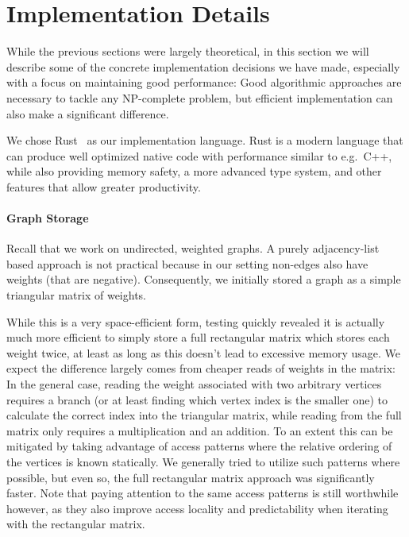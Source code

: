 \documentclass[12pt,oneside,english,parskip=full,headings=small]{scrbook}
\theoremstyle{definition}
\begin{document}
\section{Implementation Details} \label {sec:impl details}

While the previous sections were largely theoretical, in this section we will describe some of the
concrete implementation decisions we have made, especially with a focus on maintaining good
performance: Good algorithmic approaches are necessary to tackle any NP-complete problem, but
efficient implementation can also make a significant difference. 

We chose Rust~\cite{Rust} as our implementation language. Rust is a modern language that can produce
well optimized native code with performance similar to e.g.\ C++, while also providing memory
safety, a more advanced type system, and other features that allow greater productivity. 

\paragraph{Graph Storage} Recall that we work on undirected, weighted graphs. A purely
adjacency-list based approach is not practical because in our setting non-edges also have weights
(that are negative). Consequently, we initially stored a graph as a simple triangular matrix of
weights.

While this is a very space-efficient form, testing quickly revealed it is actually much more
efficient to simply store a full rectangular matrix which stores each weight twice, at least as long
as this doesn't lead to excessive memory usage. We expect the difference largely comes from cheaper
reads of weights in the matrix: In the general case, reading the weight associated with two
arbitrary vertices requires a branch (or at least finding which vertex index is the smaller one) to
calculate the correct index into the triangular matrix, while reading from the full matrix only
requires a multiplication and an addition. To an extent this can be mitigated by taking advantage of
access patterns where the relative ordering of the vertices is known statically. We generally tried
to utilize such patterns where possible, but even so, the full rectangular matrix approach was
significantly faster. Note that paying attention to the same access patterns is still worthwhile
however, as they also improve access locality and predictability when iterating with the rectangular
matrix.
\end{document}
